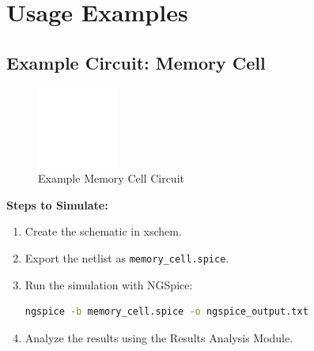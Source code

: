 \documentclass[12pt]{article}
\begin{document}
\section{Usage Examples}
\subsection{Example Circuit: Memory Cell}
\begin{figure}[htbp]
\centering
\includegraphics[width=0.8\linewidth]{example_circuit_memory.png}
\caption{Example Memory Cell Circuit}
\label{fig:memory_cell}
\end{figure}

\textbf{Steps to Simulate:}
\begin{enumerate}
    \item Create the schematic in xschem.
    \item Export the netlist as \texttt{memory\_cell.spice}.
    \item Run the simulation with NGSpice:
    \begin{lstlisting}[language=bash, breaklines=true]
    ngspice -b memory_cell.spice -o ngspice_output.txt
    \end{lstlisting}
    \item Analyze the results using the Results Analysis Module.
\end{enumerate}
\end{document}
